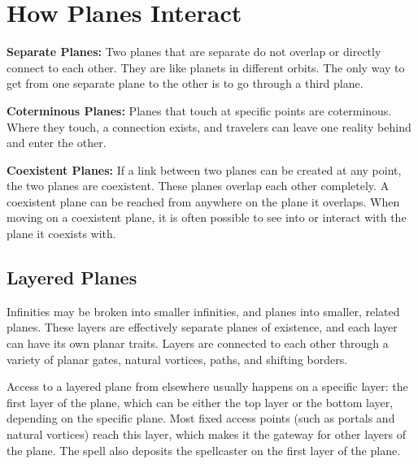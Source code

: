 \section{How Planes Interact}

\textbf{Separate Planes:} Two planes that are separate do not overlap or directly connect to each other. They are like planets in different orbits. The only way to get from one separate plane to the other is to go through a third plane.

\textbf{Coterminous Planes:} Planes that touch at specific points are coterminous. Where they touch, a connection exists, and travelers can leave one reality behind and enter the other.

\textbf{Coexistent Planes:} If a link between two planes can be created at any point, the two planes are coexistent. These planes overlap each other completely. A coexistent plane can be reached from anywhere on the plane it overlaps. When moving on a coexistent plane, it is often possible to see into or interact with the plane it coexists with.

\subsection{Layered Planes}
Infinities may be broken into smaller infinities, and planes into smaller, related planes. These layers are effectively separate planes of existence, and each layer can have its own planar traits. Layers are connected to each other through a variety of planar gates, natural vortices, paths, and shifting borders.

Access to a layered plane from elsewhere usually happens on a specific layer: the first layer of the plane, which can be either the top layer or the bottom layer, depending on the specific plane. Most fixed access points (such as portals and natural vortices) reach this layer, which makes it the gateway for other layers of the plane. The  spell also deposits the spellcaster on the first layer of the plane.
